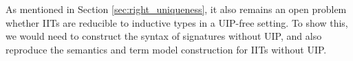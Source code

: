 \documentclass[a4paper,UKenglish,cleveref, autoref]{lipics-v2019}
\begin{document}
As mentioned in Section \ref{sec:right_uniqueness}, it also remains an open
problem whether IITs are reducible to inductive types in a UIP-free setting. To
show this, we would need to construct the syntax of signatures without UIP, and
also reproduce the semantics and term model construction for IITs without UIP.





\newpage

\appendix
\end{document}
